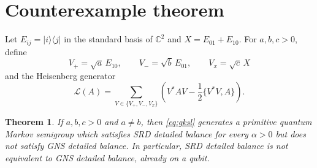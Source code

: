 \documentclass[10pt]{article}
\newtheorem{theorem}{Theorem}
\newcommand{\cL}{\mathcal L}
\begin{document}
\section*{Counterexample theorem}

Let $E_{ij}=|i\rangle\langle j|$ in the standard basis of $\mathbb C^2$ and
$X=E_{01}+E_{10}$.  For $a,b,c>0$, define
\[
 V_+=\sqrt a\,E_{10},\qquad
 V_-=\sqrt b\,E_{01},\qquad
 V_x=\sqrt c\,X
\]
and the Heisenberg generator
\begin{equation}\label{eq:gksl}
 \cL(A)=\sum_{V\in\{V_+,V_-,V_x\}}
 \left(V^*AV-\frac12\{V^*V,A\}\right).
\end{equation}

\begin{theorem}
If $a,b,c>0$ and $a\ne b$, then \eqref{eq:gksl} generates a primitive
quantum Markov semigroup which satisfies SRD detailed balance for every
$\alpha>0$ but does not satisfy GNS detailed balance.  In particular, SRD
detailed balance is not equivalent to GNS detailed balance, already on a
qubit.
\end{theorem}
\end{document}
